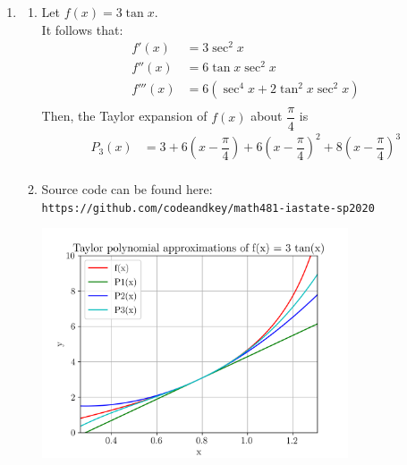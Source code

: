 \documentclass{article}
\begin{document}
\begin{enumerate}
    \item
        \begin{enumerate}
            \item Let $f(x) = 3\tan{x}.$ \\
                It follows that:
                \begin{equation*} \label{e1}
                \begin{split}
                    f'(x) & = 3 \sec^2{x} \\
                    f''(x) & = 6\tan{x}\sec^2{x} \\
                    f'''(x) & = 6(\sec^4{x}+2\tan^2{x}\sec^2{x}) \\
                \end{split}
                \end{equation*}
                Then, the Taylor expansion of $f(x)$ about $\dfrac{\pi}{4}$ is
                \begin{equation*} \label{e2}
                \begin{split}
                    P_3(x) & = 3 + 6(x - \dfrac{\pi}{4}) + 6(x - \dfrac{\pi}{4})^2 + 8(x - \dfrac{\pi}{4})^3 \\
                \end{split}
                \end{equation*}
            \item
                Source code can be found here: \\ \texttt{https://github.com/codeandkey/math481-iastate-sp2020} \\
                \begin{center}
                    \includegraphics[width=0.75\textwidth]{q1.png}
                \end{center}

\end{enumerate}
\end{enumerate}
\end{document}
